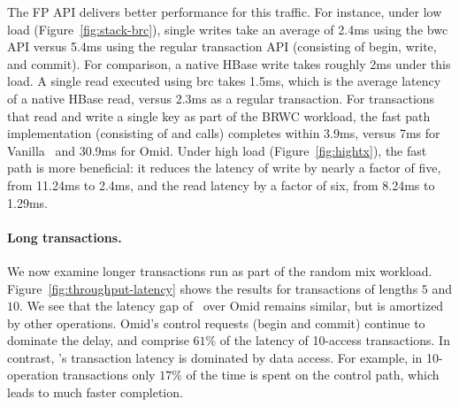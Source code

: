 The FP API delivers better performance for this traffic. For instance, under low load (Figure~\ref{fig:stack-brc}),
single writes take an average of 2.4ms using 
the {\code bwc} API versus 5.4ms using the regular transaction API (consisting of begin, write, and commit). 
For comparison, a native HBase write takes roughly 2ms under this load.
A single read executed using {\code brc} takes 1.5ms, which is the average latency of a native HBase read,
versus 2.3ms as a regular transaction. 
For transactions that read and write a single key as part of the BRWC workload, 
the fast path implementation (consisting of  and  calls) completes within 3.9ms,
versus 7ms for Vanilla \sys\ and 30.9ms for Omid. 
%
Under high load (Figure~\ref{fig:hightx}), the fast path is more beneficial: it reduces the latency of write
by nearly a factor of five, from 11.24ms  to 2.4ms, and the read latency by a factor of six, from  8.24ms to 1.29ms.



\paragraph{Long transactions.} 
We now examine longer transactions run as part of the random mix workload.
Figure~\ref{fig:throughput-latency} shows the results for transactions of lengths $5$ and $10$.
We see that the latency gap of \sys\ over Omid remains similar, but is amortized 
by other operations. Omid's control requests (begin and commit) continue to 
dominate the delay, and comprise $61\%$ of the latency of 10-access transactions.
In contrast, \sys's transaction latency is dominated by data access. For example, in 10-operation transactions only 
$17\%$ of the time is spent on the control path, which leads to much faster completion. 



